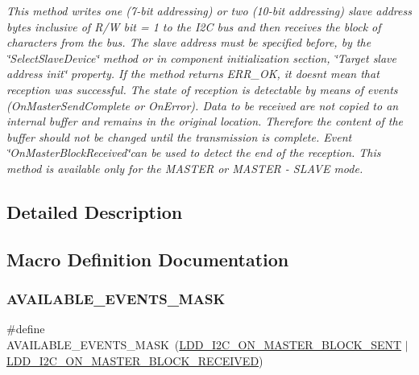\begin{DoxyCompactItemize}
\begin{DoxyCompactList}\small\item\em This method writes one (7-\/bit addressing) or two (10-\/bit addressing) slave address bytes inclusive of R/W bit = 1 to the I2C bus and then receives the block of characters from the bus. The slave address must be specified before, by the \char`\"{}\+Select\+Slave\+Device\char`\"{} method or in component initialization section, \char`\"{}\+Target slave address init\char`\"{} property. If the method returns E\+R\+R\+\_\+\+OK, it doesn\textquotesingle{}t mean that reception was successful. The state of reception is detectable by means of events (On\+Master\+Send\+Complete or On\+Error). Data to be received are not copied to an internal buffer and remains in the original location. Therefore the content of the buffer should not be changed until the transmission is complete. Event \char`\"{}\+On\+Master\+Block\+Received\char`\"{}can be used to detect the end of the reception. This method is available only for the M\+A\+S\+T\+ER or M\+A\+S\+T\+ER -\/ S\+L\+A\+VE mode. \end{DoxyCompactList}\end{DoxyCompactItemize}


\subsection{Detailed Description}


\subsection{Macro Definition Documentation}
\mbox{\label{group___i2_c2__module_ga5f04a8830cd52a3ffa1678d113f31aee}} 
\subsubsection{\texorpdfstring{A\+V\+A\+I\+L\+A\+B\+L\+E\+\_\+\+E\+V\+E\+N\+T\+S\+\_\+\+M\+A\+SK}{AVAILABLE\_EVENTS\_MASK}}
{\footnotesize\ttfamily \#define A\+V\+A\+I\+L\+A\+B\+L\+E\+\_\+\+E\+V\+E\+N\+T\+S\+\_\+\+M\+A\+SK~(\hyperlink{group___p_e___types__module_ga187d9ac85a01b75a8f871d72b9cd5fe3}{L\+D\+D\+\_\+\+I2\+C\+\_\+\+O\+N\+\_\+\+M\+A\+S\+T\+E\+R\+\_\+\+B\+L\+O\+C\+K\+\_\+\+S\+E\+NT} $\vert$ \hyperlink{group___p_e___types__module_gac4694457514889498da89fa1afe27412}{L\+D\+D\+\_\+\+I2\+C\+\_\+\+O\+N\+\_\+\+M\+A\+S\+T\+E\+R\+\_\+\+B\+L\+O\+C\+K\+\_\+\+R\+E\+C\+E\+I\+V\+ED})}

